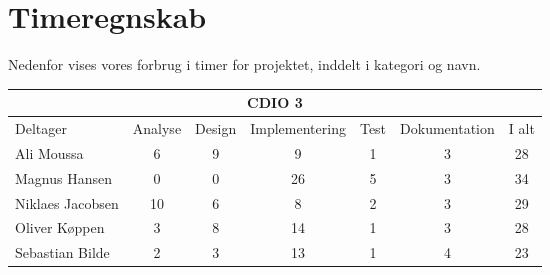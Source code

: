 \chapter*{Timeregnskab}

Nedenfor vises vores forbrug i timer for projektet, inddelt i kategori og navn.

\begin{table}[h]
    \centering
        \begin{tabular}{|l|c|c|c|c|c|c|}
                \hline
            \multicolumn{7}{|c|}{CDIO 3}
            \\ \hline
                    Deltager         &  Analyse  &  Design  &  Implementering  &  Test  &  Dokumentation  &  I alt
            \\ \hline
                    Ali Moussa       &    6      &    9     &        9         &    1   &        3        &    28
            \\ \hline
                    Magnus Hansen    &    0      &    0     &        26         &    5   &        3        &    34
            \\ \hline
                    Niklaes Jacobsen &    10      &    6     &        8         &    2   &        3        &    29
            \\ \hline
                    Oliver Køppen    &    3      &    8     &        14        &    1   &        3        &    28
            \\ \hline
                    Sebastian Bilde  &    2      &    3     &        13         &    1   &        4        &   23
            \\ \hline
        \end{tabular}
\end{table}